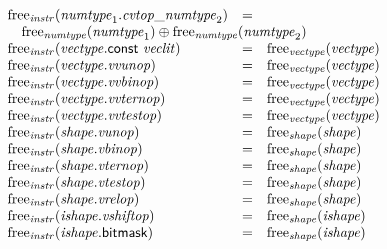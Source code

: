 $$\begin{array}[t]{@{}lcl@{}l@{}}
{\mathrm{free}}_{\mathit{instr}}({\mathit{numtype}}_1 {.} {{\mathit{cvtop}}}{\mathsf{\_}}{{\mathit{numtype}}_2}) & = & & \\
 \multicolumn{4}{@{}l@{}}{\quad
\begin{array}[t]{@{}l@{}}
{\mathrm{free}}_{\mathit{numtype}}({\mathit{numtype}}_1) \oplus {\mathrm{free}}_{\mathit{numtype}}({\mathit{numtype}}_2) \\
\end{array}
} \\
{\mathrm{free}}_{\mathit{instr}}({\mathit{vectype}}{.}\mathsf{const}~{\mathit{veclit}}) & = & {\mathrm{free}}_{\mathit{vectype}}({\mathit{vectype}}) \\
{\mathrm{free}}_{\mathit{instr}}({\mathit{vectype}} {.} {\mathit{vvunop}}) & = & {\mathrm{free}}_{\mathit{vectype}}({\mathit{vectype}}) \\
{\mathrm{free}}_{\mathit{instr}}({\mathit{vectype}} {.} {\mathit{vvbinop}}) & = & {\mathrm{free}}_{\mathit{vectype}}({\mathit{vectype}}) \\
{\mathrm{free}}_{\mathit{instr}}({\mathit{vectype}} {.} {\mathit{vvternop}}) & = & {\mathrm{free}}_{\mathit{vectype}}({\mathit{vectype}}) \\
{\mathrm{free}}_{\mathit{instr}}({\mathit{vectype}} {.} {\mathit{vvtestop}}) & = & {\mathrm{free}}_{\mathit{vectype}}({\mathit{vectype}}) \\
{\mathrm{free}}_{\mathit{instr}}({\mathit{shape}} {.} {\mathit{vunop}}) & = & {\mathrm{free}}_{\mathit{shape}}({\mathit{shape}}) \\
{\mathrm{free}}_{\mathit{instr}}({\mathit{shape}} {.} {\mathit{vbinop}}) & = & {\mathrm{free}}_{\mathit{shape}}({\mathit{shape}}) \\
{\mathrm{free}}_{\mathit{instr}}({\mathit{shape}} {.} {\mathit{vternop}}) & = & {\mathrm{free}}_{\mathit{shape}}({\mathit{shape}}) \\
{\mathrm{free}}_{\mathit{instr}}({\mathit{shape}} {.} {\mathit{vtestop}}) & = & {\mathrm{free}}_{\mathit{shape}}({\mathit{shape}}) \\
{\mathrm{free}}_{\mathit{instr}}({\mathit{shape}} {.} {\mathit{vrelop}}) & = & {\mathrm{free}}_{\mathit{shape}}({\mathit{shape}}) \\
{\mathrm{free}}_{\mathit{instr}}({\mathit{ishape}} {.} {\mathit{vshiftop}}) & = & {\mathrm{free}}_{\mathit{shape}}({\mathit{ishape}}) \\
{\mathrm{free}}_{\mathit{instr}}({\mathit{ishape}}{.}\mathsf{bitmask}) & = & {\mathrm{free}}_{\mathit{shape}}({\mathit{ishape}}) \\

\end{array}$$
